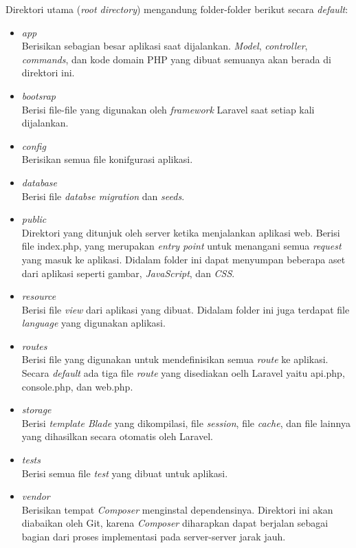 Direktori utama (\textit{root directory}) mengandung folder-folder berikut secara \textit{default}:
	\begin{itemize}
		\item  \textit{app}\\
		Berisikan sebagian besar aplikasi saat dijalankan. \textit{Model}, \textit{controller}, \textit{commands}, dan kode domain PHP yang dibuat semuanya akan berada di direktori ini.
		\item  \textit{bootsrap} \\
		Berisi file-file yang digunakan oleh \textit{framework} Laravel saat setiap kali dijalankan.
		\item  \textit{config} \\
		Berisikan semua file konifgurasi aplikasi.
		\item  \textit{database} \\
		Berisi file \textit{databse migration} dan \textit{seeds}.
		\item  \textit{public} \\
		Direktori yang ditunjuk oleh server ketika menjalankan aplikasi web. Berisi file index.php, yang merupakan \textit{entry point} untuk menangani semua \textit{request} yang masuk ke aplikasi. Didalam folder ini dapat menyumpan beberapa aset dari aplikasi seperti gambar, \textit{JavaScript}, dan \textit{CSS}.
		\item  \textit{resource }\\
		Berisi file \textit{view} dari aplikasi yang dibuat. Didalam folder ini juga terdapat file \textit{language} yang digunakan aplikasi.
		\item  \textit{routes} \\
		Berisi file yang digunakan untuk mendefinisikan semua \textit{route} ke aplikasi. Secara \textit{default} ada tiga file \textit{route} yang disediakan oelh Laravel yaitu api.php, console.php, dan web.php.
		\item  \textit{storage} \\
		Berisi \textit{template Blade} yang dikompilasi, file \textit{session}, file \textit{cache}, dan file lainnya yang dihasilkan secara otomatis oleh Laravel.
		\item  \textit{tests} \\
		Berisi semua file \textit{test} yang dibuat untuk aplikasi.
		\item  \textit{vendor} \\
		Berisikan tempat \textit{Composer} menginstal dependensinya. Direktori ini akan diabaikan oleh Git, karena \textit{Composer} diharapkan dapat berjalan sebagai bagian dari proses implementasi pada server-server jarak jauh.
	\end{itemize}
